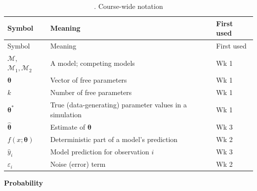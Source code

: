 \begin{longtable}[]{@{}
  >{\raggedright\arraybackslash}p{}
  >{\raggedright\arraybackslash}p{}
  >{\raggedright\arraybackslash}p{}@{}}
\caption{. Course-wide notation}\tabularnewline
\toprule\noalign{}
\begin{minipage}[b]{\linewidth}\raggedright
Symbol
\end{minipage} & \begin{minipage}[b]{\linewidth}\raggedright
Meaning
\end{minipage} & \begin{minipage}[b]{\linewidth}\raggedright
First used
\end{minipage} \\
\midrule\noalign{}
\endfirsthead
\toprule\noalign{}
\begin{minipage}[b]{\linewidth}\raggedright
Symbol
\end{minipage} & \begin{minipage}[b]{\linewidth}\raggedright
Meaning
\end{minipage} & \begin{minipage}[b]{\linewidth}\raggedright
First used
\end{minipage} \\
\midrule\noalign{}
\endhead
\bottomrule\noalign{}
\endlastfoot
\(\mathcal{M}\), \(\mathcal{M}_1, \mathcal{M}_2\) & A model; competing
models & Wk 1 \\
\(\boldsymbol\theta\) & Vector of free parameters & Wk 1 \\
\(k\) & Number of free parameters & Wk 1 \\
\(\boldsymbol\theta^\ast\) & True (data-generating) parameter values in
a simulation & Wk 1 \\
\(\hat{\boldsymbol\theta}\) & Estimate of \(\boldsymbol\theta\) & Wk
3 \\
\(f(x;\boldsymbol\theta)\) & Deterministic part of a model's prediction
& Wk 2 \\
\(\hat y_i\) & Model prediction for observation \(i\) & Wk 3 \\
\(\varepsilon_i\) & Noise (error) term & Wk 2 \\
\end{longtable}

\textbf{Probability}


